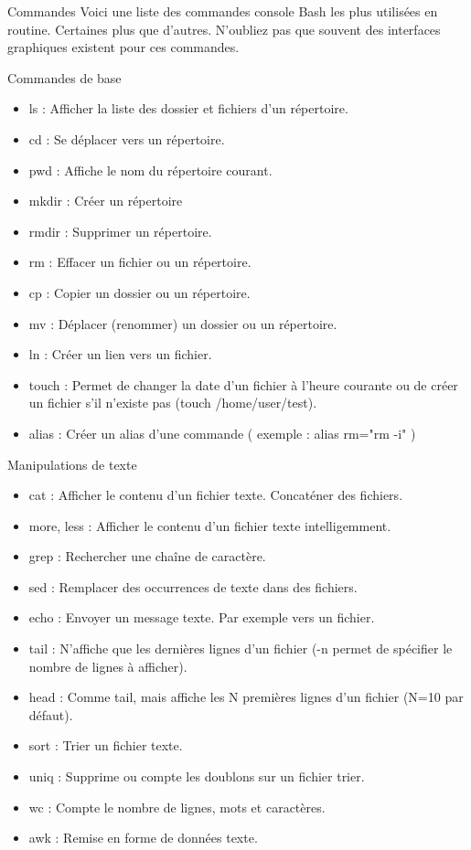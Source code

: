 \documentclass[10pt]{beamer}
\begin{document}
\begin{frame}{Commandes}
Voici une liste des commandes console Bash les plus utilisées en routine. Certaines
plus que d'autres. N'oubliez pas que souvent des interfaces graphiques existent
pour ces commandes.
\end{frame}
\begin{frame}{Commandes de base }
\begin{itemize}
\item \alert{ls} : Afficher la liste des dossier et fichiers d'un répertoire.
\item \alert{cd} : Se déplacer vers un répertoire.
\item \alert{pwd} : Affiche le nom du répertoire courant.
\item \alert{mkdir} : Créer un répertoire
\item \alert{rmdir} : Supprimer un répertoire.
\item \alert{rm} : Effacer un fichier ou un répertoire.
\item \alert{cp} : Copier un dossier ou un répertoire.
\item \alert{mv} : Déplacer (renommer) un dossier ou un répertoire.
\item \alert{ln} : Créer un lien vers un fichier.
\item \alert{touch} : Permet de changer la date d'un fichier à l'heure courante ou de créer un fichier s'il n'existe pas (touch /home/user/test).
\item \alert{alias} : Créer un alias d'une commande ( exemple : alias rm="rm -i" )
\end{itemize}
\end{frame}

\begin{frame}{Manipulations de texte}
\begin{itemize}
\item \alert{cat} : Afficher le contenu d'un fichier texte. Concaténer des fichiers.
\item \alert{more}, less : Afficher le contenu d'un fichier texte intelligemment.
\item \alert{grep} : Rechercher une chaîne de caractère.
\item \alert{sed} : Remplacer des occurrences de texte dans des fichiers.
\item \alert{echo} : Envoyer un message texte. Par exemple vers un fichier.
\item \alert{tail} : N’affiche que les dernières lignes d’un fichier (-n permet de spécifier le nombre de lignes à afficher).
\item \alert{head} : Comme tail, mais affiche les N premières lignes d’un fichier (N=10 par défaut).
\item \alert{sort} : Trier un fichier texte.
\item \alert{uniq} : Supprime ou compte les doublons sur un fichier trier.
\item \alert{wc} : Compte le nombre de lignes, mots et caractères.
\item \alert{awk} : Remise en forme de données texte.
\end{itemize}
\end{frame}
\end{document}
